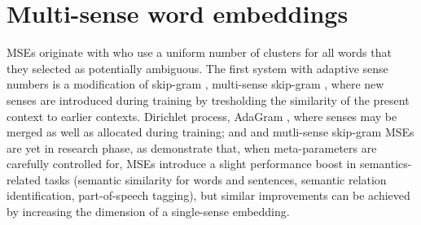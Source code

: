 \documentclass[11pt]{article}
\begin{document}

%



\section{Multi-sense word embeddings}


MSEs originate with \cite{Reisinger:2010,Huang:2012} who use a uniform number
of clusters for all words that they selected as potentially ambiguous.  The
first system with adaptive
sense numbers is a modification of skip-gram \cite{Mikolov:2013d}, multi-sense
skip-gram \citep{Neelakantan:2014}, where new senses are introduced during
training by tresholding the similarity of the present context to earlier
contexts.  Dirichlet process, AdaGram \citep{Bartunov:2015}, where senses may
be merged as well as allocated during training; and and mutli-sense skip-gram
\citep{Li:2015}
MSEs are yet in research phase, as \cite{Li:2015}  demonstrate that, when
meta-parameters are carefully controlled for, MSEs introduce a slight
performance boost in semantics-related tasks (semantic similarity for words and
sentences, semantic relation identification, part-of-speech tagging), but
similar improvements can be achieved by increasing the dimension of a
single-sense embedding.
\end{document}
